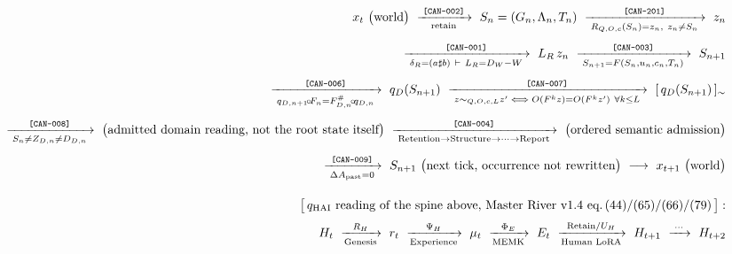 %
\begingroup\footnotesize
\begin{equation}\label{eq:root-master}
\begin{aligned}
x_t\ \big(\text{world}\big)
 \ \xrightarrow[\text{retain}]{\;\texttt{[CAN-002]}\;}\
 S_n=(G_n,\Lambda_n,T_n)
 \ \xrightarrow[\;R_{Q,O,c}(S_n)=z_n,\ z_n\neq S_n\;]{\;\texttt{[CAN-201]}\;}\
 z_n\\[4pt]
 \ \xrightarrow[\;\delta_R=(a\sharp b)\ \vdash\ L_R=D_W-W\;]{\;\texttt{[CAN-001]}\;}\
 L_R\,z_n
 \ \xrightarrow[\;S_{n+1}=F(S_n,u_n,c_n,T_n)\;]{\;\texttt{[CAN-003]}\;}\
 S_{n+1}\\[4pt]
 \ \xrightarrow[\;q_{D,n+1}\!\circ\!F_n=F^{\#}_{D,n}\!\circ\!q_{D,n}\;]{\;\texttt{[CAN-006]}\;}\
 q_D(S_{n+1})
 \ \xrightarrow[\;z\sim_{Q,O,c,L}z'\iff O(F^kz){=}O(F^kz')\ \forall k\le L\;]{\;\texttt{[CAN-007]}\;}\
 [\,q_D(S_{n+1})\,]_{\sim}\\[4pt]
 \ \xrightarrow[\;S_n\neq Z_{D,n}\neq D_{D,n}\;]{\;\texttt{[CAN-008]}\;}\
 \big(\text{admitted domain reading, not the root state itself}\big)
 \ \xrightarrow[\;\text{Retention}\to\text{Structure}\to\cdots\to\text{Report}\;]{\;\texttt{[CAN-004]}\;}\
 \big(\text{ordered semantic admission}\big)\\[4pt]
 \ \xrightarrow[\;\Delta A_{\mathrm{past}}=0\;]{\;\texttt{[CAN-009]}\;}\
 S_{n+1}\ \big(\text{next tick, occurrence not rewritten}\big)
 \ \longrightarrow\ x_{t+1}\ \big(\text{world}\big)\\[10pt]
\big[\,q_{\mathrm{HAI}}\ \text{reading of the spine above, Master River v1.4 eq.\,(44)/(65)/(66)/(79)}\,\big]:\\[2pt]
H_t\ \xrightarrow[\text{Genesis}]{R_H}\ r_t\ \xrightarrow[\text{Experience}]{\Psi_H}\ \mu_t\ \xrightarrow[\text{MEMK}]{\Phi_E}\ E_t
 \ \xrightarrow[\text{Human LoRA}]{\mathrm{Retain}/U_H}\ H_{t+1}\ \xrightarrow{\;\cdots\;}\ H_{t+2}

\end{aligned}
\end{equation}
